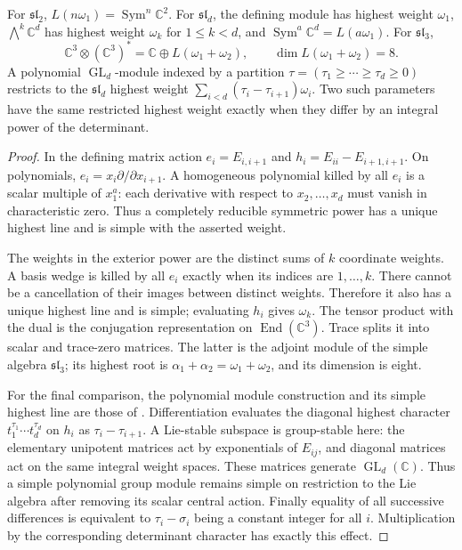 \begin{example}
\label{res:G09}
For \(\mathfrak{sl}_2\), \(L(n\omega_1)=\operatorname{Sym}^n\mathbb C^2\).
For \(\mathfrak{sl}_d\), the defining module has highest weight
\(\omega_1\), \(\bigwedge^k\mathbb C^d\) has highest weight
\(\omega_k\) for \(1\leq k<d\), and
\(\operatorname{Sym}^a\mathbb C^d=L(a\omega_1)\).
For \(\mathfrak{sl}_3\),
\[
 \mathbb C^3\otimes(\mathbb C^3)^*
   =\mathbb C\oplus L(\omega_1+\omega_2),
 \qquad \dim L(\omega_1+\omega_2)=8 .
\]
A polynomial \(\operatorname{GL}_d\)-module indexed by a partition
\(\tau=(\tau_1\geq\cdots\geq\tau_d\geq0)\) restricts to the
\(\mathfrak{sl}_d\) highest weight
\(\sum_{i<d}(\tau_i-\tau_{i+1})\omega_i\).
Two such parameters have the same restricted highest weight exactly
when they differ by an integral power of the determinant.
\end{example}
\begin{proof}
In the defining matrix action \(e_i=E_{i,i+1}\) and
\(h_i=E_{ii}-E_{i+1,i+1}\). On polynomials,
\(e_i=x_i\partial/\partial x_{i+1}\).
A homogeneous polynomial killed by all \(e_i\) is a scalar
multiple of \(x_1^a\): each derivative with respect to
\(x_2,\ldots,x_d\) must vanish in characteristic zero.
Thus a completely reducible symmetric power has a unique highest
line and is simple with the asserted weight.

The weights in the exterior power are the distinct sums of \(k\)
coordinate weights. A basis wedge is killed by all \(e_i\) exactly
when its indices are \(1,\ldots,k\). There cannot be a cancellation
of their images between distinct weights. Therefore it also has
a unique highest line and is simple; evaluating \(h_i\) gives
\(\omega_k\).
The tensor product with the dual is the conjugation representation
on \(\operatorname{End}(\mathbb C^3)\).
Trace splits it into scalar and trace-zero matrices.
The latter is the adjoint module of the simple algebra
\(\mathfrak{sl}_3\); its highest root is
\(\alpha_1+\alpha_2=\omega_1+\omega_2\), and its dimension is eight.

For the final comparison, the polynomial module construction and
its simple highest line are those of
\cite[Chapter 4]{finite-representations}. Differentiation evaluates
the diagonal highest character \(t_1^{\tau_1}\cdots t_d^{\tau_d}\)
on \(h_i\) as \(\tau_i-\tau_{i+1}\).
A Lie-stable subspace is group-stable here: the elementary
unipotent matrices act by exponentials of \(E_{ij}\), and diagonal
matrices act on the same integral weight spaces.
These matrices generate \(\operatorname{GL}_d(\mathbb C)\).
Thus a simple polynomial group module remains simple on
restriction to the Lie algebra after removing its scalar central
action. Finally equality of all successive differences is
equivalent to \(\tau_i-\sigma_i\) being a constant integer for
all \(i\). Multiplication by the corresponding determinant
character has exactly this effect.
\end{proof}
